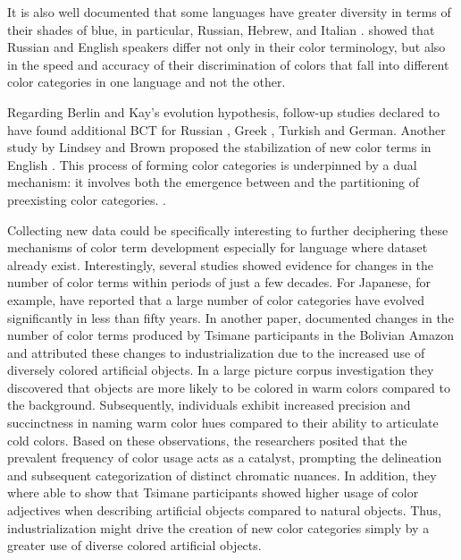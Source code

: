 It is also well documented that some languages have greater diversity in terms of their shades of blue, in particular, Russian, Hebrew, and Italian \parencite{winawerRussian2007, CerquegliniHebrew, Paggetti2016ColorNI}. \textcite{winawerRussian2007} showed that Russian and English speakers differ not only in their color terminology, but also in the speed and accuracy of their discrimination of colors that fall into different color categories in one language and not the other.


Regarding Berlin and Kay's evolution hypothesis, follow-up studies declared to have found additional BCT for Russian \parencite{daviesBasic1994}, Greek \parencite{thierryUnconscious2009}, Turkish \parencite{ozgenTurkish1998} and German\parencite{zollingerWhy1984}. Another study by Lindsey and Brown proposed the stabilization of new color terms in English \parencite{lindseyColor2014}. This process of forming color categories is underpinned by a dual mechanism: it involves both the emergence between \parencite{levinsonYeli2000} and the partitioning \parencite{kayLinguistic1978} of preexisting color categories.
\parencite{lindseyColor2014}.

Collecting new data could be specifically interesting to further deciphering these mechanisms of color term development especially for language where dataset already exist. Interestingly, several studies showed evidence for changes in the number of color terms within periods of just a few decades. For Japanese, for example, \textcite{kurikiModern2017} have reported that a large number of color categories have evolved significantly in less than fifty years. In another paper, \textcite{gibsonColor2017} documented changes in the number of color terms produced by Tsimane participants in the Bolivian Amazon and attributed these changes to industrialization due to the increased use of diversely colored artificial objects. In a large picture corpus investigation they discovered that objects are more likely to be colored in warm colors compared to the background. Subsequently, individuals exhibit increased precision and succinctness in naming warm color hues compared to their ability to articulate cold colors. Based on these observations, the researchers posited that the prevalent frequency of color usage acts as a catalyst, prompting the delineation and subsequent categorization of distinct chromatic nuances. In addition, they where able to show that Tsimane participants showed higher usage of color adjectives when describing artificial objects compared to natural objects. Thus, industrialization might drive the creation of new color categories simply by a greater use of diverse colored artificial objects.

